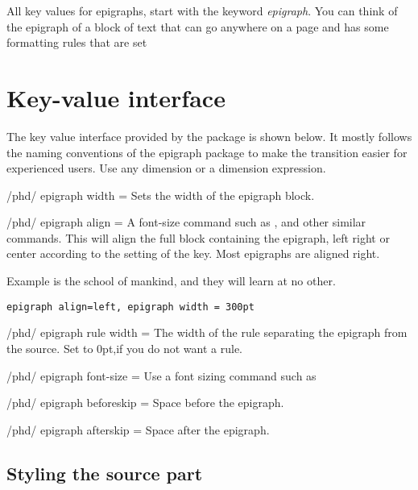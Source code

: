 All key values for epigraphs, start with the keyword \emph{epigraph}. You can think of the epigraph of a block of text that can go anywhere on a page and has some formatting rules that are set 

\section{Key-value interface}
The key value interface provided by the package is shown below. It mostly follows the 
naming conventions of the epigraph package to make the transition easier for experienced users. Use any dimension or a dimension expression.
\medskip

\begin{key}{/phd/ epigraph width = }
  Sets the width of the epigraph block. 
\end{key}


\begin{key}{/phd/ epigraph align = }
 A font-size command such as , 
 and other similar commands. This will align the full block containing the epigraph, left right or center according to the setting of the key. Most epigraphs are aligned right.
\end{key}

\epigraph{Example is the school of mankind, and they
will learn at no other.}{\texttt{epigraph align=left, epigraph width = 300pt}}


\begin{key}{/phd/ epigraph rule width = }
 The width of the rule separating the epigraph from the source. Set to 0pt,if you do not want a rule.
\end{key}

\begin{key}{/phd/ epigraph font-size = }  Use a font sizing command such as \cmd{\footnotesize}
\end{key}

\begin{key}{/phd/ epigraph beforeskip = }
Space before the epigraph.
\end{key}

\begin{key}{/phd/ epigraph afterskip = }
Space after the epigraph.
\end{key}

\subsection{Styling the source part}

